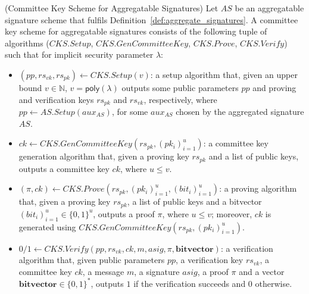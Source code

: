 \begin{definition}
\label{def: committee_key} (Committee Key Scheme for Aggregatable Signatures) Let $\mathit{AS}$ be an aggregatable signature scheme that fulfils 
Definition~\ref{def:aggregate_signatures}.  A committee key scheme for aggregatable signatures consists of the following tuple of algorithms 
($\mathit{CKS.Setup}$, $\mathit{CKS.GenCommitteeKey}$, $\mathit{CKS.Prove}$, $\mathit{CKS.Verify}$) 
such that for implicit security parameter $\lambda$: 

\begin{itemize}
\item $(\mathit{pp}, \mathit{rs}_{\mathit{vk}}, \mathit{rs}_{\mathit{pk}}) \leftarrow \mathit{CKS.Setup}(v)$: a setup algorithm that, 
given an upper bound $v \in \mathbb{N}$, $v = \mathsf{poly}(\lambda)$ outputs some public parameters $\mathit{pp}$ and 
proving and verification keys $\mathit{rs}_{\mathit{pk}}$ and $\mathit{rs}_{\mathit{vk}}$, respectively,  
where $\mathit{pp} \leftarrow \mathit{AS.Setup}(\mathit{aux_{\mathit{AS}}})$, for some 
$\mathit{aux_{\mathit{AS}}}$ chosen by the aggregated signature $\mathit{AS}$.

\item $\mathit{ck} \leftarrow \mathit{CKS.GenCommitteeKey}(\mathit{rs}_{\mathit{pk}}, (\mathit{pk_i})_{i=1}^u)$: a committee key generation algorithm that, 
given a proving key $\mathit{rs}_{\mathit{pk}}$ and a list of public keys, 
outputs a committee key $\mathit{ck}$, where $u \leq v$.

\item $(\pi, \mathit{ck}) \leftarrow \mathit{CKS.Prove}(\mathit{rs}_{\mathit{pk}}, (\mathit{pk_i})_{i=1}^u, (\mathit{bit_i})_{i=1}^u)$: a proving algorithm that, 
given a proving key $\mathit{rs}_{\mathit{pk}}$, a list of public keys and a bitvector $(\mathit{bit_i})_{i=1}^u \in \{0,1\}^u$,  
outputs a proof $\pi$, where $u \leq v$; moreover, $\mathit{ck}$ is generated using $\mathit{CKS.GenCommitteeKey}(\mathit{rs}_{\mathit{pk}}, (\mathit{pk_i})_{i=1}^u)$.
 
\item $0/1 \leftarrow \mathit{CKS.Verify}(\mathit{pp}, \mathit{rs}_{\mathit{vk}}, \mathit{ck}, m, \mathit{asig}, \pi, \mathbf{bitvector})$: a verification algorithm that, 
given public parameters $\mathit{pp}$, a verification key $\mathit{rs}_{\mathit{vk}}$, a committee key $\mathit{ck}$, a message $m$, a 
signature $\mathit{asig}$, a proof $\pi$ and a vector  $\mathbf{bitvector} \in \{0,1\}^*$, 
outputs $1$ if the verification succeeds and $0$ otherwise. 
\end{itemize}


\end{definition}
